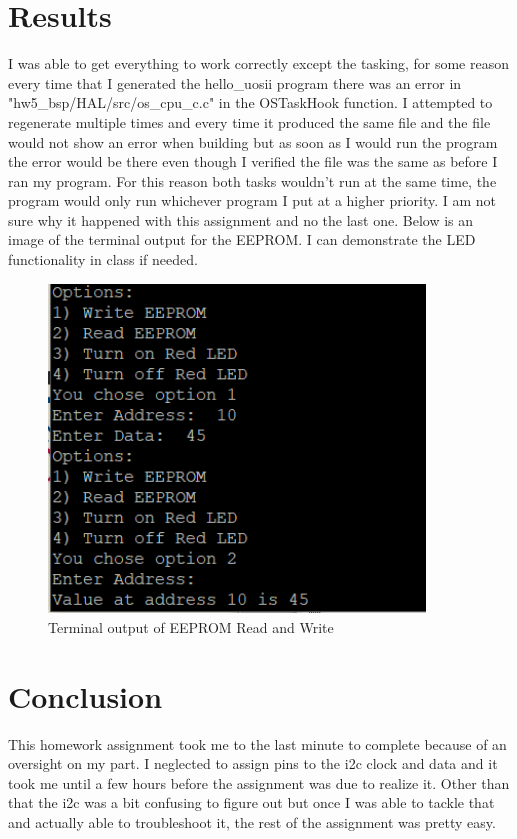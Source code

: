 \documentclass[10pt,a4paper]{article}
\begin{document}
	\section{Results}
	I was able to get everything to work correctly except the tasking, for some reason every time that I generated the hello\_uosii program there was an error in "hw5\_bsp/HAL/src/os\_cpu\_c.c" in the OSTaskHook function. I attempted to regenerate multiple times and every time it produced the same file and the file would not show an error when building but as soon as I would run the program the error would be there even though I verified the file was the same as before I ran my program. For this reason both tasks wouldn't run at the same time, the program would only run whichever program I put at a higher priority. I am not sure why it happened with this assignment and no the last one. Below is an image of the terminal output for the EEPROM. I can demonstrate the LED functionality in class if needed.
	
	\begin{figure}[H]
		\centering\includegraphics[width=10cm]{EEPROM_Term_Output.png}
		\caption{Terminal output of EEPROM Read and Write}
		\label{tex}
	\end{figure}

	\section{Conclusion}
	This homework assignment took me to the last minute to complete because of an oversight on my part. I neglected to assign pins to the i2c clock and data and it took me until a few hours before the assignment was due to realize it. Other than that the i2c was a bit confusing to figure out but once I was able to tackle that and actually able to troubleshoot it, the rest of the assignment was pretty easy.
	
\end{document}

